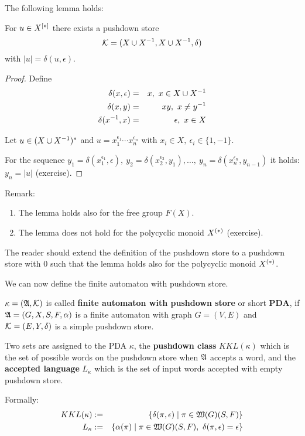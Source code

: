 The following lemma holds:
\begin{lemma}
For $u \in \mbox{${X}^{[*]}$}$ there exists a pushdown store
\[ \mbox{$\mathcal{K}$} =(X \cup {X}^{-1}, X \cup {X}^{-1}, \delta) \]
with $|u| = \delta(u, \epsilon)$.
\end{lemma}

\begin{proof}
Define
\begin{eqnarray*}
\delta(x, \epsilon) & = & x,\ x\in X \cup {X}^{-1}\\
\delta(x, y) & = & x y,\ x\neq y^{-1}\\
\delta(x^{-1}, x) & = & \epsilon,\ x\in X
\end{eqnarray*}

Let $u\in (X \cup {X}^{-1})^*$ and $u = x_1^{\epsilon_1} \cdots x_n^{\epsilon_n}$
with $x_i\in X,\ \epsilon_i\in \{1, -1\}$.

For the sequence $y_1 = \delta(x_1^{\epsilon_1}, \epsilon),\ y_2 =
\delta(x_2^{\epsilon_2}, y_1), \ldots,\ y_n = \delta(x_n^{\epsilon_n}, y_{n-1})$
it holds: $y_n = |u|$ (exercise).
\end{proof}

Remark:
\begin{enumerate}
  \item The lemma holds also for the free group $F(X)$.
  \item The lemma does not hold for the polycyclic monoid $\mbox{${X}^{(*)}$}$
  (exercise).
\end{enumerate}

The reader should extend the definition of the pushdown store to a
pushdown store with 0 such that the lemma holds also for the polycyclic monoid
$\mbox{${X}^{(*)}$}$.

We can now define the finite automaton with pushdown store.

\begin{definition}
$\kappa = (\mbox{$\mathfrak{A}$}, \mbox{$\mathcal{K}$})$ is called {\bf finite automaton with
pushdown store} or short {\bf PDA}, if $\mbox{$\mathfrak{A}$} = (G, X, S, F, \alpha)$ is a
finite automaton with graph $G = (V, E)$ and $\mbox{$\mathcal{K}$} = (E, Y,\delta)$ is a
simple pushdown store.
\end{definition}

Two sets are assigned to the PDA $\kappa$, the {\bf pushdown class}
$KKL(\kappa)$ which is the set of possible words on the pushdown store when
$\mbox{$\mathfrak{A}$}$ accepts a word, and the {\bf accepted language} $L_\kappa$ which is the
set of input words accepted with empty pushdown store.

Formally:
\begin{eqnarray*}
KKL(\kappa) &:=& \{ \delta(\pi, \epsilon) \mid \pi \in \pathcat{G}(S, F) \} \\
L_\kappa &:=& \{ \alpha(\pi) \mid \pi \in \pathcat{G}(S, F),\ \delta(\pi,
\epsilon) = \epsilon \}
\end{eqnarray*}

